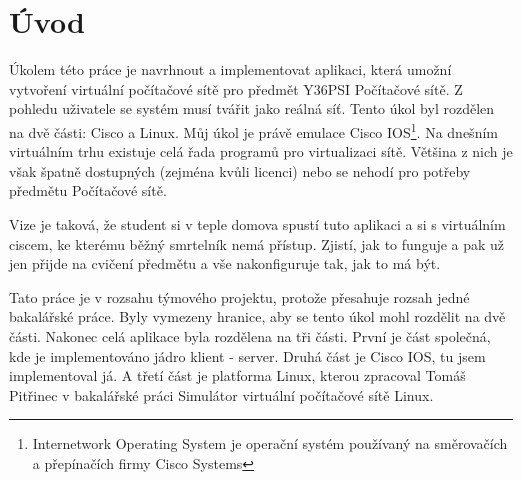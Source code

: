 \chapter{Úvod} \label{uvod}


Úkolem této práce je navrhnout a implementovat aplikaci, která umožní vytvoření virtuální počítačové sítě pro předmět Y36PSI Počítačové sítě. Z pohledu uživatele se systém musí tvářit jako reálná síť. Tento úkol byl rozdělen na dvě části: Cisco a Linux. Můj úkol je právě emulace Cisco IOS\footnote{Internetwork Operating System je operační systém používaný na směrovačích a přepínačích firmy Cisco Systems}. Na dnešním virtuálním trhu existuje celá řada programů pro virtualizaci sítě. Většina z nich je však špatně dostupných (zejména kvůli licenci) nebo se nehodí pro potřeby předmětu Počítačové sítě. 

Vize je taková, že student si v teple domova spustí tuto aplikaci a  si s virtuálním ciscem, ke kterému běžný smrtelník nemá přístup. Zjistí, jak to funguje a pak už jen přijde na cvičení předmětu a vše nakonfiguruje tak, jak to má být. 

Tato práce je v rozsahu týmového projektu, protože přesahuje rozsah jedné bakalářské práce. Byly vymezeny hranice, aby se tento úkol mohl rozdělit na dvě části. Nakonec celá aplikace byla rozdělena na tři části. První je část společná, kde je implementováno jádro klient - server. Druhá část je Cisco IOS, tu jsem implementoval já. A třetí část je platforma Linux, kterou zpracoval Tomáš Pitřinec v bakalářské práci Simulátor virtuální počítačové sítě Linux.

